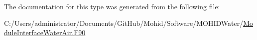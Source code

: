 The documentation for this type was generated from the following file\+:\begin{DoxyCompactItemize}
\item 
C\+:/\+Users/administrator/\+Documents/\+Git\+Hub/\+Mohid/\+Software/\+M\+O\+H\+I\+D\+Water/\mbox{\hyperlink{_module_interface_water_air_8_f90}{Module\+Interface\+Water\+Air.\+F90}}\end{DoxyCompactItemize}
